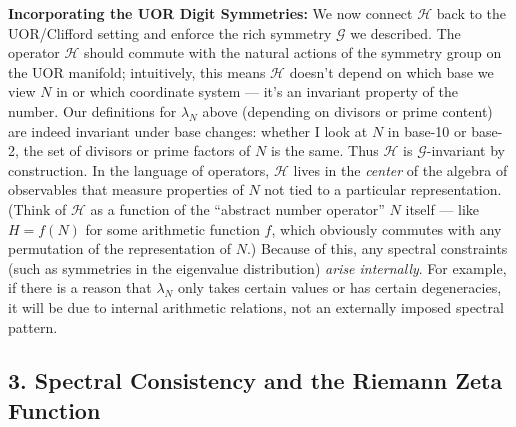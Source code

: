 \documentclass{article}
\begin{document}
\medskip

\textbf{Incorporating the UOR Digit Symmetries:} We now connect $\mathcal{H}$ back to the UOR/Clifford setting and enforce the rich symmetry $\mathcal{G}$ we described. The operator $\mathcal{H}$ should commute with the natural actions of the symmetry group on the UOR manifold; intuitively, this means $\mathcal{H}$ doesn’t depend on which base we view $N$ in or which coordinate system --- it’s an invariant property of the number. Our definitions for $\lambda_N$ above (depending on divisors or prime content) are indeed invariant under base changes: whether I look at $N$ in base-10 or base-2, the set of divisors or prime factors of $N$ is the same. Thus $\mathcal{H}$ is $\mathcal{G}$-invariant by construction. In the language of operators, $\mathcal{H}$ lives in the \emph{center} of the algebra of observables that measure properties of $N$ not tied to a particular representation. (Think of $\mathcal{H}$ as a function of the ``abstract number operator'' $N$ itself --- like $H=f(N)$ for some arithmetic function $f$, which obviously commutes with any permutation of the representation of $N$.) Because of this, any spectral constraints (such as symmetries in the eigenvalue distribution) \emph{arise internally}. For example, if there is a reason that $\lambda_N$ only takes certain values or has certain degeneracies, it will be due to internal arithmetic relations, not an externally imposed spectral pattern.

\subsection*{3. Spectral Consistency and the Riemann Zeta Function}
\end{document}
